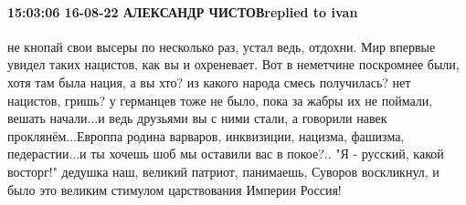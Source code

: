  
 
 
 
 

\paragraph{15:03:06 16-08-22 АЛЕКСАНДР ЧИСТОВreplied to ivan}

не кнопай свои высеры по несколько раз, устал ведь, отдохни. Мир впервые увидел
таких нацистов, как вы и охреневает. Вот в неметчине поскромнее были, хотя там
была нация, а вы хто? из какого народа смесь получилась? нет нацистов, гришь? у
германцев тоже не было, пока за жабры их не поймали, вешать начали...и ведь
друзьями вы с ними стали, а говорили навек проклянём...Европпа родина варваров,
инквизиции, нацизма, фашизма, педерастии...и ты хочешь шоб мы оставили вас в
покое?.. "Я - русский, какой восторг!" дедушка наш, великий патриот, панимаешь,
Суворов воскликнул, и было это великим стимулом царствования Империи Россия!
